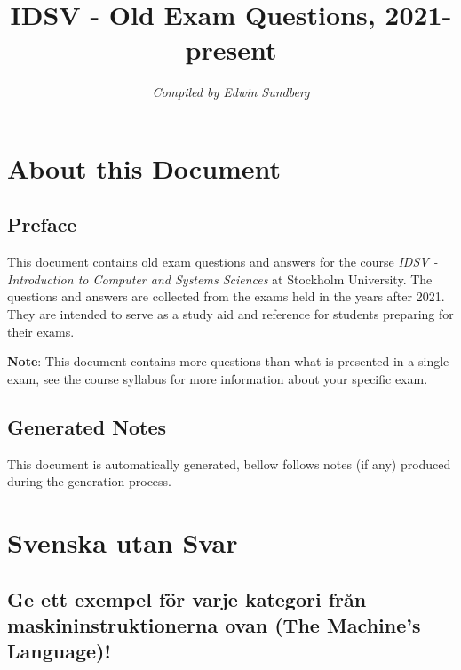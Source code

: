 \documentclass[a4paper,11pt,oneside]{book}
\title{IDSV - Old Exam Questions, 2021-present}
\author{\textit{Compiled by Edwin Sundberg}}
\begin{document}
\maketitle \pagebreak

\begin{sloppypar}  

\tableofcontents \pagebreak

\chapter{About this Document}

\section{Preface}
\label{preface}
This document contains old exam questions and answers for the course \textit{IDSV - Introduction to Computer and Systems Sciences} at Stockholm University. The questions and answers are collected from the exams held in the years after 2021. They are intended to serve as a study aid and reference for students preparing for their exams.


\textbf{Note}: This document contains more questions than what is presented in a single exam, see the course syllabus for more information about your specific exam.

\section{Generated Notes}
\label{generatedNotes}

This document is automatically generated, bellow follows notes (if any) produced during the generation process.



\chapter{Svenska utan Svar}
\label{svenskaUtanSvar}

\section{Ge ett exempel f\"or varje kategori fr\r{a}n maskininstruktionerna ovan (The Machine{\textquoteright}s Language)!}

\label{q:1:sa:sv:False}


\end{sloppypar}
\end{document}
